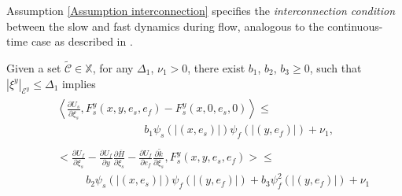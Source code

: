 Assumption \ref{Assumption interconnection} specifies the \emph{interconnection condition} between the 
slow and fast dynamics during flow, analogous to the continuous-time case as described in \cite[pp. 451]{nonlinear_systems_Khalil}.%
%
\begin{assum}
    Given a set $\widetilde {\mathcal{C}} \in \mathbb{X}$, for any $\Delta_1$, $\nu_1>0$, there exist $b_1$, $b_2$, $b_3 \geq 0$, such that $|\xi^y|_{\mathcal{E}^y} \leq \Delta_1$ implies
    \begin{align*}
        &\begin{aligned}
            &\left < \tfrac{\partial {U_s}}{\partial \xi_s}, F_s^y(x,y,e_s,e_f) - F_s^y(x,0,e_s,0)  \right> \leq
            \\
            &\phantom{aaaaaaaaaaaaaaa} b_1 \psi_s\left(\left| (x, e_s) \right|\right) \psi_f\left(\left| (y, e_f) \right|\right) + \nu_1, 
        \end{aligned}
        \\
        &\begin{aligned}
            &\Big< \tfrac{\partial {U_f}}{\partial \xi_s} - \tfrac{\partial {U_f}}{\partial y} \tfrac{\partial \overline{H}}{\partial \xi_s} - \tfrac{\partial {U_f}}{\partial e_f} \tfrac{\partial \tilde k}{\partial \xi_s} ,  F_s^y(x,y,e_s,e_f) \Big> \leq
            \\
            & \phantom{aaaaa} b_2 \psi_s\left(\left| (x, e_s) \right|\right) \psi_f\left(\left| (y, e_f) \right|\right) + b_3 \psi_f^2\left(\left| (y, e_f) \right|\right) + \nu_1
        \end{aligned}
    \end{align*}
%  

\end{assum}
